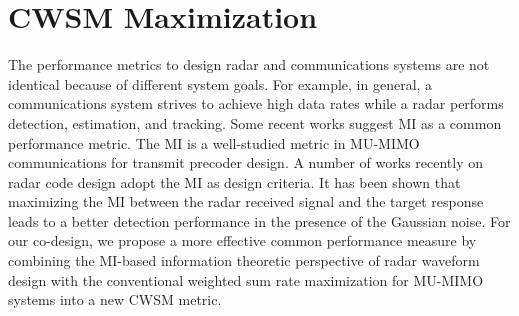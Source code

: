 \documentclass[10pt,journal]{IEEEtran}
\newcommand{\ith}[1]    {{#1}^{\underline{\text{th}}}}
\newcommand{\rr}{_\mathrm{r}}
\newcommand{\rnr}{_{\mathrm{r},n_\mathrm{r}}}
\theoremstyle{definition}
\begin{document}
	\section{CWSM Maximization}
	\label{sec: formulation}
	The performance metrics to design radar and communications systems are not identical because of different system goals. For example, in general, a communications system strives to achieve high data rates while a radar performs detection, estimation, and tracking. Some recent works \cite{alaee2020information,dokhanchi2020multi,ni2020waveform} suggest MI as a common performance metric. The MI is a well-studied metric in MU-MIMO communications for transmit precoder design\cite{Luo2011IterativeWMMSE}. A number of works recently on radar code design adopt the MI as design criteria\cite{Colornoise_waveform,Jammer_game,NaghshTSP2017,JianLi2019,20MISTAP}. %
	It has been shown \cite{Jammer_game} that maximizing the MI between the radar received signal and the target response leads to a better detection performance in the presence of the Gaussian noise. For our co-design, we propose a more effective common performance measure by combining the MI-based information theoretic perspective of radar waveform design with the conventional weighted sum rate maximization for MU-MIMO systems into a new CWSM metric.
	
	
\end{document}
